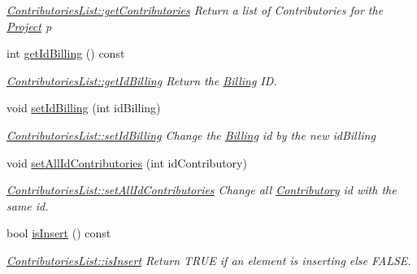 \begin{DoxyCompactItemize}
\begin{DoxyCompactList}\small\item\em \hyperlink{classModels_1_1ContributoriesList_a2549547fd3866d879ebbfd1f38145fc5}{Contributories\+List\+::get\+Contributories} Return a list of Contributories for the \hyperlink{classModels_1_1Project}{Project} {\itshape p} \end{DoxyCompactList}\item 
int \hyperlink{classModels_1_1ContributoriesList_a3fbbce49ffcdbfa0693f4d21dd0d8c14}{get\+Id\+Billing} () const 
\begin{DoxyCompactList}\small\item\em \hyperlink{classModels_1_1ContributoriesList_a3fbbce49ffcdbfa0693f4d21dd0d8c14}{Contributories\+List\+::get\+Id\+Billing} Return the \hyperlink{classModels_1_1Billing}{Billing} I\+D. \end{DoxyCompactList}\item 
void \hyperlink{classModels_1_1ContributoriesList_ad93d74f1b3e0a4ad83bad859812b3547}{set\+Id\+Billing} (int id\+Billing)
\begin{DoxyCompactList}\small\item\em \hyperlink{classModels_1_1ContributoriesList_ad93d74f1b3e0a4ad83bad859812b3547}{Contributories\+List\+::set\+Id\+Billing} Change the \hyperlink{classModels_1_1Billing}{Billing} id by the new {\itshape id\+Billing} \end{DoxyCompactList}\item 
void \hyperlink{classModels_1_1ContributoriesList_a313800788580eb469df125fe8d47c6a6}{set\+All\+Id\+Contributories} (int id\+Contributory)
\begin{DoxyCompactList}\small\item\em \hyperlink{classModels_1_1ContributoriesList_a313800788580eb469df125fe8d47c6a6}{Contributories\+List\+::set\+All\+Id\+Contributories} Change all \hyperlink{classModels_1_1Contributory}{Contributory} id with the same id. \end{DoxyCompactList}\item 
bool \hyperlink{classModels_1_1ContributoriesList_a286c41aee939305541eeadfa64ee17a7}{is\+Insert} () const 
\begin{DoxyCompactList}\small\item\em \hyperlink{classModels_1_1ContributoriesList_a286c41aee939305541eeadfa64ee17a7}{Contributories\+List\+::is\+Insert} Return T\+R\+U\+E if an element is inserting else F\+A\+L\+S\+E. \end{DoxyCompactList}\item 

\end{DoxyCompactItemize}

